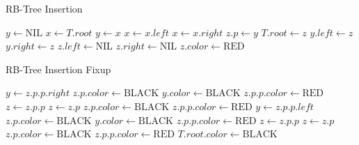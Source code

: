 \documentclass{article}
\begin{document}
\begin{algorithm}
\caption{RB-Tree Insertion}
\begin{algorithmic}[1]
  \State $y \gets \text{NIL}$
  \State $x \gets T.root$
    \State $y \gets x$
      \State $x \gets x.left$
    \Else
      \State $x \gets x.right$
    \EndIf
  \EndWhile
  \State $z.p \gets y$
    \State $T.root \gets z$
    \State $y.left \gets z$
  \Else
    \State $y.right \gets z$
  \EndIf
  \State $z.left \gets \text{NIL}$
  \State $z.right \gets \text{NIL}$
  \State $z.color \gets \text{RED}$
  \State {}
\EndProcedure
\end{algorithmic}
\end{algorithm}

\begin{algorithm}
    \caption{RB-Tree Insertion Fixup}
    \begin{algorithmic}
      \State $y \gets z.p.p.right$
        \State $z.p.color \gets \text{BLACK}$
        \State $y.color \gets \text{BLACK}$
        \State $z.p.p.color \gets \text{RED}$
        \State $z \gets z.p.p$
      \Else
          \State $z \gets z.p$
          \State {}
        \EndIf
        \State $z.p.color \gets \text{BLACK}$
        \State $z.p.p.color \gets \text{RED}$
        \State {}
      \EndIf
    \Else
      \State $y \gets z.p.p.left$
        \State $z.p.color \gets \text{BLACK}$
        \State $y.color \gets \text{BLACK}$
        \State $z.p.p.color \gets \text{RED}$
        \State $z \gets z.p.p$
      \Else
          \State $z \gets z.p$
          \State {}
        \EndIf
        \State $z.p.color \gets \text{BLACK}$
        \State $z.p.p.color \gets \text{RED}$
        \State {}
      \EndIf
    \EndIf
  \EndWhile
  \State $T.root.color \gets \text{BLACK}$
\EndProcedure

    \end{algorithmic}
\end{algorithm}
\pagebreak
\end{document}
